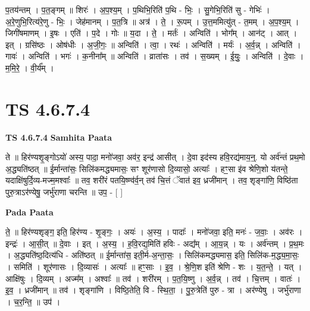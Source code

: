 \documentclass[17pt]{extarticle}
\begin{document}
प॒तय॑न्तम् । प॒त॒ङ्गम् ॥ शिरः॑ । अ॒प॒श्य॒म् । प॒थिभि॒रिति॑ प॒थि - भिः॒ । सु॒गेभि॒रिति॑ सु - गेभिः॑ । अ॒रे॒णुभि॒रित्य॑रे॒णु - भिः॒ । जेह॑मानम् । प॒त॒त्रि ॥ अत्र॑ । ते॒ । रू॒पम् । उ॒त्त॒ममित्यु॑त् - त॒मम् । अ॒प॒श्य॒म् । जिगी॑षमाणम् । इ॒षः । एति॑ । प॒दे । गोः ॥ य॒दा । ते॒ । मर्तः॑ । अन्विति॑ । भोग᳚म् । आन॑ट् । आत् । इत् । ग्रसि॑ष्ठः । ओष॑धीः । अ॒जी॒गः॒ ॥ अन्विति॑ । त्वा॒ । रथः॑ । अन्विति॑ । मर्यः॑ । अ॒र्व॒न्न् । अन्विति॑ । गावः॑ । अन्विति॑ । भगः॑ । क॒नीना᳚म् ॥ अन्विति॑ । व्राता॑सः । तव॑ । स॒ख्यम् । ई॒युः॒ । अन्विति॑ । दे॒वाः । म॒मि॒रे॒ । वी॒र्य᳚म् ।  \newline





\section{ TS 4.6.7.4 }

\textbf{TS 4.6.7.4 } \newline
\textbf{Samhita Paata} \newline

ते ॥ हिर॑ण्यशृ॒ङ्गोऽयो॑ अस्य॒ पादा॒ मनो॑जवा॒ अव॑र॒ इन्द्र॑ आसीत् । दे॒वा इद॑स्य हवि॒रद्य॑माय॒न्॒. यो अर्व॑न्तं प्रथ॒मो अ॒द्ध्यति॑ष्ठत् ॥ ई॒र्मान्ता॑सः॒ सिलि॑कमद्ध्यमासः॒ सꣳ शूर॑णासो दि॒व्यासो॒ अत्याः᳚ । हꣳ॒॒सा इ॑व श्रेणि॒शो य॑तन्ते॒ यदाक्षि॑षुर्दि॒व्य-मज्म॒मश्वाः᳚ ॥ तव॒ शरी॑रं पतयि॒ष्ण्व॑र्व॒न् तव॑ चि॒त्तं ॅवात॑ इव॒ ध्रजी॑मान् । तव॒ शृङ्गा॑णि॒ विष्ठि॑ता पुरु॒त्राऽर॑ण्येषु॒ जर्भु॑राणा चरन्ति ॥ उप॒ - [  ] \newline

\textbf{Pada Paata} \newline

ते॒ ॥ हिर॑ण्यशृङ्ग॒ इति॒ हिर॑ण्य - शृ॒ङ्गः॒ । अयः॑ । अ॒स्य॒ । पादाः᳚ । मनो॑जवा॒ इति॒ मनः॑ - ज॒वाः॒ । अव॑रः । इन्द्रः॑ । आ॒सी॒त् ॥ दे॒वाः । इत् । अ॒स्य॒ । ह॒वि॒रद्य॒मिति॑ हविः - अद्य᳚म् । आ॒य॒न्न् । यः । अर्व॑न्तम् । प्र॒थ॒मः । अ॒द्ध्यति॑ष्ठ॒दित्य॑धि - अति॑ष्ठत् ॥ ई॒र्मान्ता॑स॒ इती॒र्म-अ॒न्ता॒सः॒ । सिलि॑कमद्ध्यमास॒ इति॒ सिलि॑क-म॒द्ध्य॒मा॒सः॒ । समिति॑ । शूर॑णासः । दि॒व्यासः॑ । अत्याः᳚ ॥ हꣳ॒॒साः । इ॒व॒ । श्रे॒णि॒श इति॑ श्रेणि - शः । य॒त॒न्ते॒ । यत् । आक्षि॑षुः । दि॒व्यम् । अज्म᳚म् । अश्वाः᳚ ॥ तव॑ । शरी॑रम् । प॒त॒यि॒ष्णु । अ॒र्व॒न्न् । तव॑ । चि॒त्तम् । वातः॑ । इ॒व॒ । ध्रजी॑मान् ॥ तव॑ । शृङ्गा॑णि । विष्ठि॒तेति॒ वि - स्थि॒ता॒ । पु॒रु॒त्रेति॑ पुरु - त्रा । अर॑ण्येषु । जर्भु॑राणा । च॒र॒न्ति॒ ॥ उप॑ ।  \newline
\end{document}
